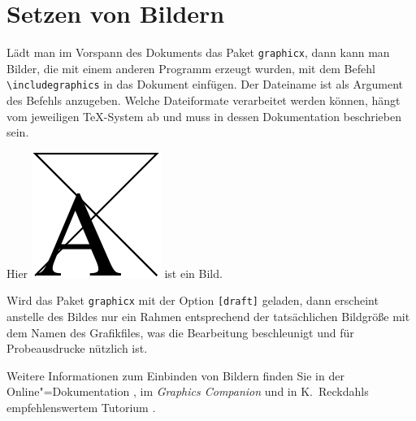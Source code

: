 
\section{Setzen von Bildern} \label{graphics}
Lädt man im Vorspann des Dokuments das Paket \texttt{graphicx},
dann kann man Bilder, die mit einem anderen Programm erzeugt wurden, 
mit dem Befehl \verb|\includegraphics| in das Dokument einfügen.
Der Dateiname ist als Argument des Befehls anzugeben.
Welche Dateiformate verarbeitet werden können, hängt vom jeweiligen
\TeX-System ab und muss in dessen Dokumentation beschrieben sein.

\begin{LTXexample}
Hier \includegraphics{a} ist ein Bild.
\end{LTXexample}


\noindent Wird das Paket \texttt{graphicx} mit der Option \texttt{[draft]} geladen,
dann erscheint anstelle des Bildes nur ein Rahmen entsprechend
der tatsächlichen Bildgröße mit dem Namen des Grafikfiles, 
was die Bearbeitung beschleunigt und für Probeausdrucke nützlich ist.

Weitere Informationen zum Einbinden von Bildern finden Sie in der
Online"=Dokumentation \cite{grfguide}, im \textit{Graphics Companion}
\cite{grfcomp} und in K.~Reckdahls empfehlenswertem  Tutorium \cite{epslatex}.



